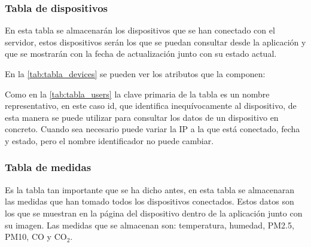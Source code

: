 \subsubsection{Tabla de dispositivos}
En esta tabla se almacenarán los dispositivos que se han conectado con el servidor, estos dispositivos serán los que se puedan consultar desde la aplicación y que se mostrarán con la fecha de actualización junto con su estado actual.

En la \autoref{tab:tabla_devices} se pueden ver los atributos que la componen:

\begin{table}[H]
    \centering
    \caption{Tabla devices BBDD}
    \label{tab:tabla_devices}
    \end{table}
Como en la \autoref{tab:tabla_users} la clave primaria de la tabla es un nombre representativo, en este caso id, que identifica inequívocamente al dispositivo, de esta manera se puede utilizar para consultar los datos de un dispositivo en concreto. Cuando sea necesario puede variar la IP a la que está conectado, fecha y estado, pero el nombre identificador no puede cambiar.

\subsubsection{Tabla de medidas}
Es la tabla tan importante que se ha dicho antes, en esta tabla se almacenaran las medidas que han tomado todos los dispositivos conectados. Estos datos son los que se muestran en la página del dispositivo dentro de la aplicación junto con su imagen. Las medidas que se almacenan son: temperatura, humedad, PM2.5, PM10, CO y CO$_2$.

